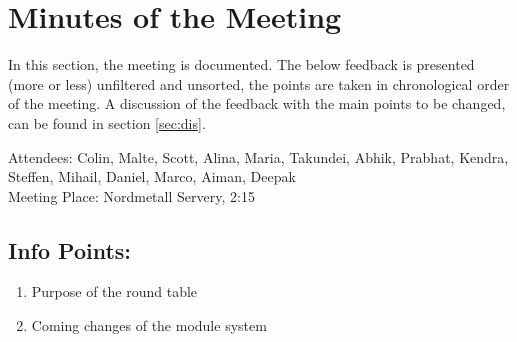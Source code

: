 
\section{Minutes of the Meeting}
\label{sec-1}
In this section, the meeting is documented. The below feedback is presented (more or less) unfiltered and unsorted, the points are taken in chronological order of the meeting. 
A discussion of the feedback with the main points to be changed, can be found in section \ref{sec:dis}. 

\noindent Attendees: Colin, Malte, Scott, Alina, Maria, Takundei, Abhik, Prabhat, Kendra, Steffen, Mihail, Daniel, Marco, Aiman, Deepak\\
\noindent Meeting Place: Nordmetall Servery, 2:15
\subsection{Info Points:}
\label{sec-1-1}
\begin{enumerate}
\item Purpose of the round table
\item Coming changes of the module system
\end{enumerate}
